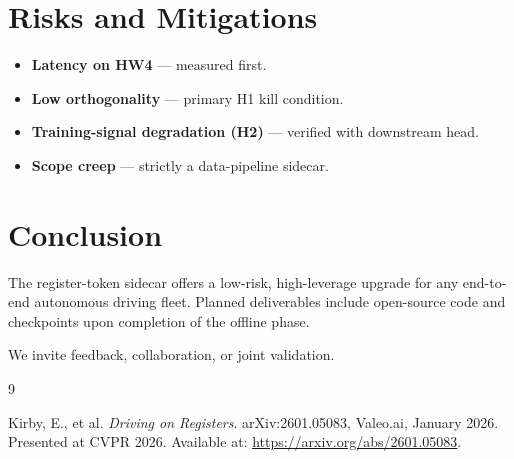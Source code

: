 \documentclass[11pt]{article}
\begin{document}
\section{Risks and Mitigations}

\begin{itemize}
  \item \textbf{Latency on HW4} --- measured first.
  \item \textbf{Low orthogonality} --- primary H1 kill condition.
  \item \textbf{Training-signal degradation (H2)} --- verified with downstream head.
  \item \textbf{Scope creep} --- strictly a data-pipeline sidecar.
\end{itemize}

\section{Conclusion}

The register-token sidecar offers a low-risk, high-leverage upgrade for any end-to-end autonomous driving fleet. Planned deliverables include open-source code and checkpoints upon completion of the offline phase.

We invite feedback, collaboration, or joint validation.

\begin{thebibliography}{9}

Kirby, E., et al.
\newblock \emph{Driving on Registers}.
\newblock arXiv:2601.05083, Valeo.ai, January 2026.
\newblock Presented at CVPR 2026.
\newblock Available at: \url{https://arxiv.org/abs/2601.05083}.

\end{thebibliography}
\end{document}
